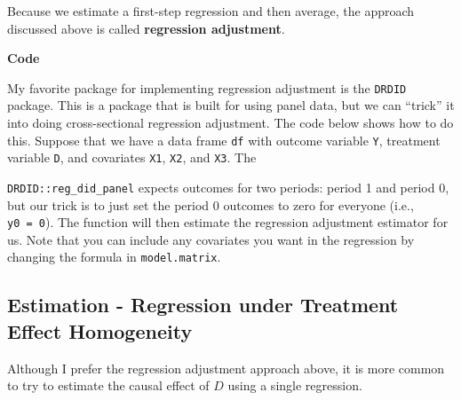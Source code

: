 \documentclass[
  letterpaper,
  DIV=11,
  numbers=noendperiod]{scrreprt}
\newenvironment{Shaded}{\begin{snugshade}}{\end{snugshade}}
\newcommand{\AttributeTok}[1]{\textcolor[rgb]{0.40,0.45,0.13}{#1}}
\newcommand{\CommentTok}[1]{\textcolor[rgb]{0.37,0.37,0.37}{#1}}
\newcommand{\DecValTok}[1]{\textcolor[rgb]{0.68,0.00,0.00}{#1}}
\newcommand{\FunctionTok}[1]{\textcolor[rgb]{0.28,0.35,0.67}{#1}}
\newcommand{\NormalTok}[1]{\textcolor[rgb]{0.00,0.23,0.31}{#1}}
\newcommand{\OtherTok}[1]{\textcolor[rgb]{0.00,0.23,0.31}{#1}}
\newcommand{\SpecialCharTok}[1]{\textcolor[rgb]{0.37,0.37,0.37}{#1}}
\begin{document}
Because we estimate a first-step regression and then average, the
approach discussed above is called \textbf{regression adjustment}.

\textbf{Code}

My favorite package for implementing regression adjustment is the
\texttt{DRDID} package. This is a package that is built for using panel
data, but we can ``trick'' it into doing cross-sectional regression
adjustment. The code below shows how to do this. Suppose that we have a
data frame \texttt{df} with outcome variable \texttt{Y}, treatment
variable \texttt{D}, and covariates \texttt{X1}, \texttt{X2}, and
\texttt{X3}. The

\begin{Shaded}
\end{Shaded}

\texttt{DRDID::reg\_did\_panel} expects outcomes for two periods: period
1 and period 0, but our trick is to just set the period 0 outcomes to
zero for everyone (i.e., \texttt{y0\ =\ 0}). The function will then
estimate the regression adjustment estimator for us. Note that you can
include any covariates you want in the regression by changing the
formula in \texttt{model.matrix}.

\subsection{Estimation - Regression under Treatment Effect
Homogeneity}\label{estimation---regression-under-treatment-effect-homogeneity}

Although I prefer the regression adjustment approach above, it is more
common to try to estimate the causal effect of \(D\) using a single
regression.
\end{document}
